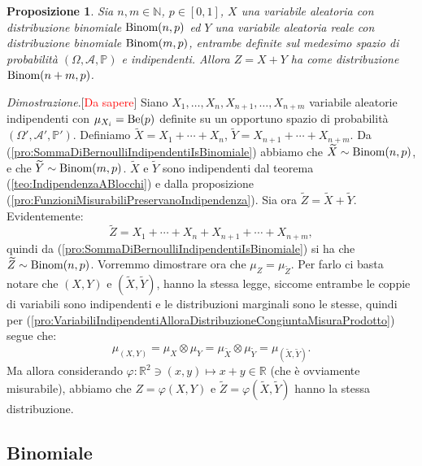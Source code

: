 \documentclass[11pt]{book}
\makeatletter
\theoremstyle{Definizione}
\theoremstyle{TeoremaProposizioneLemmaCorollario}
\newtheorem{mypropo}[myteo]{Proposizione}
\theoremstyle{OsservazioneNota}
\renewenvironment{proof}[1][\proofname]{\par
  \normalfont \topsep6\p@\@plus6\p@\relax
  \trivlist
  \item[\hskip\labelsep
        \itshape
    #1\@addpunct{.}]\ignorespaces
}{%
  \endtrivlist\@endpefalse
}
\newcommand{\R}{\mathbb{R}}
\newcommand{\N}{\mathbb{N}}
\renewcommand{\P}{\mathbb{P}}
\renewenvironment{proof}{\textsl{Dimostrazione}.}{}
\makeatother
\begin{document}
\begin{boxpro}
\begin{mypropo}
Sia $n,m\in \N$, $p\in [0,1]$, $X$ una variabile aleatoria con distribuzione binomiale $\textup{Binom}(n,p)$ ed $Y$ una variabile aleatoria reale con distribuzione binomiale $\textup{Binom}(m,p)$, entrambe definite sul medesimo spazio di probabilità $(\Omega,\mathcal{A},\P)$ e indipendenti. Allora $Z = X+Y$ ha come distribuzione $\textup{Binom}(n+m,p)$.
\end{mypropo}
\tcblower
\begin{proof}[\textcolor{red}{Da sapere}]
Siano $X_1,\dots,X_{n},X_{n+1},\dots,X_{n+m}$ variabile aleatorie indipendenti con $\mu_{X_i} = \textup{Be}(p)$ definite su un opportuno spazio di probabilità $(\Omega',\mathcal{A}',\P')$. Definiamo $\widetilde{X} = X_1+\cdots+X_n$, $\widetilde{Y} = X_{n+1}+\cdots+X_{n+m}$. Da (\ref{pro:SommaDiBernoulliIndipendentiIsBinomiale}) abbiamo che $\widetilde{X} \sim \textup{Binom}(n,p)$, e che $\widetilde{Y} \sim \textup{Binom}(m,p)$. $\widetilde{X}$ e $\widetilde{Y}$ sono indipendenti dal teorema (\ref{teo:IndipendenzaABlocchi}) e dalla proposizione (\ref{pro:FunzioniMisurabiliPreservanoIndipendenza}). Sia ora $\widetilde{Z} = \widetilde{X}+\widetilde{Y}$. Evidentemente:
$$
\widetilde{Z} = X_1 + \cdots+ X_n + X_{n+1} + \cdots + X_{n+m},
$$
quindi da (\ref{pro:SommaDiBernoulliIndipendentiIsBinomiale}) si ha che $\widetilde{Z} \sim \textup{Binom}(n,p)$. Vorremmo dimostrare ora che $\mu_Z = \mu_{\widetilde{Z}}$. Per farlo ci basta notare che $(X,Y)$ e $(\widetilde{X},\widetilde{Y})$, hanno la stessa legge, siccome entrambe le coppie di variabili sono indipendenti e le distribuzioni marginali sono le stesse, quindi per (\ref{pro:VariabiliIndipendentiAlloraDistribuzioneCongiuntaMisuraProdotto}) segue che:
$$
\mu_{(X,Y)} = \mu_X \otimes \mu_Y = \mu_{\widetilde{X}}\otimes \mu_{\widetilde{Y}} = \mu_{(\widetilde{X},\widetilde{Y})}.
$$
Ma allora considerando $\varphi:\R^2\ni (x,y)\longmapsto x+y\in \R$ (che è ovviamente misurabile), abbiamo che $Z = \varphi(X,Y)$ e $\widetilde{Z} = \varphi(\widetilde{X},\widetilde{Y})$ hanno la stessa distribuzione.
\end{proof}
\end{boxpro}
\subsection{Binomiale}
\end{document}
